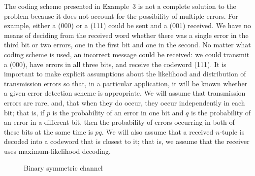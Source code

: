 
The coding scheme presented in Example~3 is not a complete solution to
the problem because it does not account for the possibility of
multiple errors. For example, either a (000) or a (111) could be sent
and a (001) received. We have no means of deciding from the received
word whether there was a single error in the third bit or two errors,
one in the first bit and one in the second.  No matter what coding 
scheme is used, an incorrect message could
be received: we could transmit a (000), have errors in all three
bits, and receive the codeword (111). It is important to make explicit
assumptions about the likelihood and distribution of transmission
errors so that, in a particular application, it will be known whether
a given
error detection scheme is appropriate. We will assume that
transmission errors are rare, and, that when they do occur, they occur
independently in each bit; that is, if $p$ is the probability of an
error in one bit and $q$ is the probability of an error in a different
bit, then the probability of errors occurring in both of these bits at
the same time is $pq$. We will also assume that a received $n$-tuple 
is
decoded into a codeword that is closest to it; that is, we assume that
the receiver uses {\bfi maximum-likelihood
decoding}.
 
 
\begin{figure}[htb]  %
\begin{center}

\end{center}
\caption{Binary symmetric channel}
\label{channel}
\end{figure}
 
